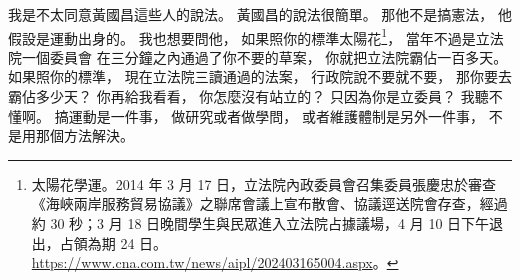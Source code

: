 \hypertarget{w01:cue:3141}{}我是不太同意黃國昌這些人的說法。
\hypertarget{w01:cue:3142}{}黃國昌的說法很簡單。
\hypertarget{w01:cue:3143}{}那他不是搞憲法，
\hypertarget{w01:cue:3144}{}他假設是運動出身的。
\hypertarget{w01:cue:3145}{}我也想要問他，
\hypertarget{w01:cue:3146}{}如果照你的標準太陽花\footnote{太陽花學運。2014 年 3 月 17 日，立法院內政委員會召集委員張慶忠於審查《海峽兩岸服務貿易協議》之聯席會議上宣布散會、協議逕送院會存查，經過約 30 秒；3 月 18 日晚間學生與民眾進入立法院占據議場，4 月 10 日下午退出，占領為期 24 日。\url{https://www.cna.com.tw/news/aipl/202403165004.aspx}。}，
\hypertarget{w01:cue:3147}{}當年不過是立法院一個委員會
\hypertarget{w01:cue:3148}{}在三分鐘之內通過了你不要的草案，
\hypertarget{w01:cue:3149}{}你就把立法院霸佔一百多天。
\hypertarget{w01:cue:3150}{}如果照你的標準，
\hypertarget{w01:cue:3151}{}現在立法院三讀通過的法案，
\hypertarget{w01:cue:3152}{}行政院說不要就不要，
\hypertarget{w01:cue:3153}{}那你要去霸佔多少天？
\hypertarget{w01:cue:3154}{}你再給我看看，
\hypertarget{w01:cue:3155}{}你怎麼沒有站立的？
\hypertarget{w01:cue:3156}{}只因為你是立委員？
\hypertarget{w01:cue:3157}{}我聽不懂啊。
\hypertarget{w01:cue:3158}{}搞運動是一件事，
\hypertarget{w01:cue:3159}{}做研究或者做學問，
\hypertarget{w01:cue:3160}{}或者維護體制是另外一件事，
\hypertarget{w01:cue:3161}{}不是用那個方法解決。

